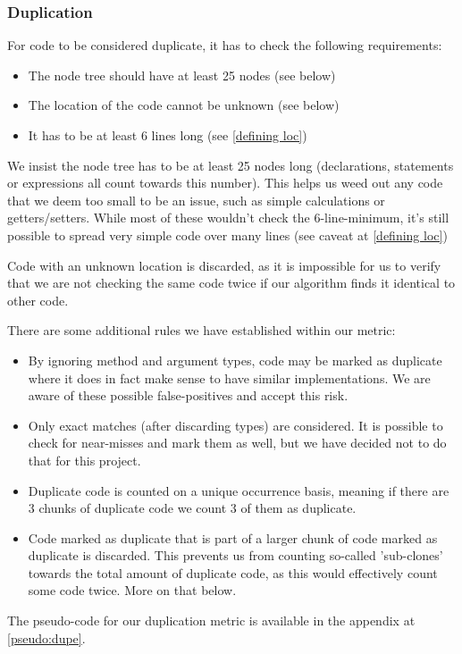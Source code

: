 \documentclass{article}
\begin{document}
\subsubsection{Duplication} \label{dupereqs}
For code to be considered duplicate, it has to check the following requirements:
\begin{itemize}
\item The node tree should have at least 25 nodes (see below)
\item The location of the code cannot be unknown (see below)
\item It has to be at least 6 lines long (see \ref{defining loc})
\end{itemize}

We insist the node tree has to be at least 25 nodes long (declarations, statements or expressions all count towards this number). This helps us weed out any code that we deem too small to be an issue, such as simple calculations or getters/setters. While most of these wouldn't check the 6-line-minimum, it's still possible to spread very simple code over many lines (see caveat at \ref{defining loc})

Code with an unknown location is discarded, as it is impossible for us to verify that we are not checking the same code twice if our algorithm finds it identical to other code.

There are some additional rules we have established within our metric:
\begin{itemize}
\item By ignoring method and argument types, code may be marked as duplicate where it does in fact make sense to have similar implementations. We are aware of these possible false-positives and accept this risk.
\item Only exact matches (after discarding types) are considered. It is possible to check for near-misses and mark them as well, but we have decided not to do that for this project.
\item Duplicate code is counted on a unique occurrence basis, meaning if there are 3 chunks of duplicate code we count 3 of them as duplicate.
\item Code marked as duplicate that is part of a larger chunk of code marked as duplicate is discarded. This prevents us from counting so-called 'sub-clones' towards the total amount of duplicate code, as this would effectively count some code twice. More on that below.
\end{itemize}

The pseudo-code for our duplication metric is available in the appendix at \ref{pseudo:dupe}.
\end{document}
